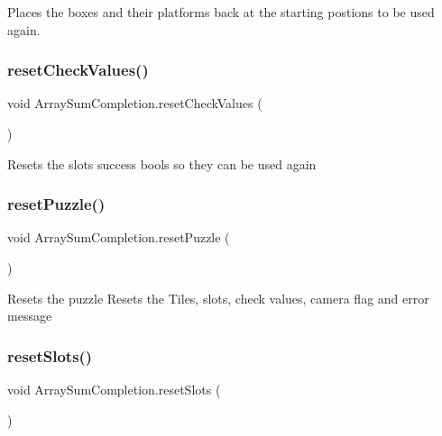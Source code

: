 Places the boxes and their platforms back at the starting postions to be used again. 

\mbox{\label{class_array_sum_completion_a3ae23072215cde0cdce19c8f8b773b7b}} 
\subsubsection{\texorpdfstring{reset\+Check\+Values()}{resetCheckValues()}}
{\footnotesize\ttfamily void Array\+Sum\+Completion.\+reset\+Check\+Values (\begin{DoxyParamCaption}{ }\end{DoxyParamCaption})}

Resets the slot\textquotesingle{}s success bools so they can be used again \mbox{\label{class_array_sum_completion_a7ebbac41382a93bf539032555a3c9bd9}} 
\subsubsection{\texorpdfstring{reset\+Puzzle()}{resetPuzzle()}}
{\footnotesize\ttfamily void Array\+Sum\+Completion.\+reset\+Puzzle (\begin{DoxyParamCaption}{ }\end{DoxyParamCaption})}

Resets the puzzle Resets the Tiles, slots, check values, camera flag and error message \mbox{\label{class_array_sum_completion_a033797d55e28346be6d4821f3bdc2daa}} 
\subsubsection{\texorpdfstring{reset\+Slots()}{resetSlots()}}
{\footnotesize\ttfamily void Array\+Sum\+Completion.\+reset\+Slots (\begin{DoxyParamCaption}{ }\end{DoxyParamCaption})}



